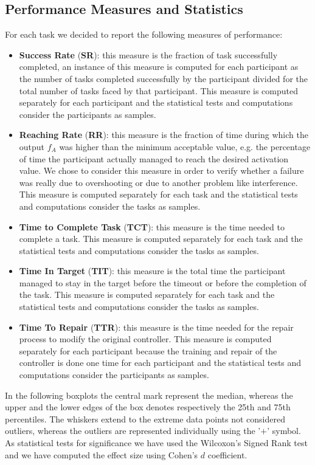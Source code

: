 \subsection{Performance Measures and Statistics}\label{subsec:measures}
For each task we decided to report the following measures of performance:
\begin{itemize}
    \item \textbf{Success Rate} (\textbf{SR}): this measure is the fraction of task successfully completed, an instance of this measure is computed for each participant as the number of tasks completed successfully by the participant divided for the total number of tasks faced by that participant. This measure is computed separately for each participant and the statistical tests and computations consider the participants as samples.
    \item \textbf{Reaching Rate} (\textbf{RR}): this measure is the fraction of time during which the output $f_A$ was higher than the minimum acceptable value, e.g. the percentage of time the participant actually managed to reach the desired activation value.
    We chose to consider this measure in order to verify whether a failure was really due to overshooting or due to another problem like interference.
    This measure is computed separately for each task and the statistical tests and computations consider the tasks as samples.
    \item \textbf{Time to Complete Task} (\textbf{TCT}): this measure is the time needed to complete a task. This measure is computed separately for each task and the statistical tests and computations consider the tasks as samples.
    \item \textbf{Time In Target} (\textbf{TIT}): this measure is the total time the participant managed to stay in the target before the timeout or before the completion of the task. This measure is computed separately for each task and the statistical tests and computations consider the tasks as samples.
    \item \textbf{Time To Repair} (\textbf{TTR}): this measure is the time needed for the repair process to modify the original controller. This measure is computed separately for each participant because the training and repair of the controller is done one time for each participant and the statistical tests and computations consider the participants as samples.
\end{itemize}
In the following boxplots the central mark represent the median, whereas the upper and the lower edges of the box denotes respectively the 25th and 75th percentiles. The whiskers extend to the extreme data points not considered outliers, whereas the outliers are represented individually using the '$+$' symbol.
As statistical tests for significance we have used the Wilcoxon's Signed Rank test and we have computed the effect size using Cohen's $d$ coefficient.
